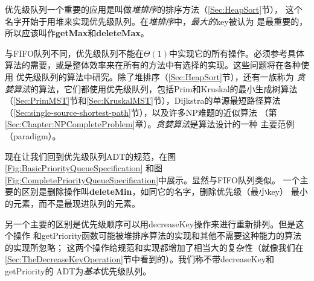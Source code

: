 优先级队列一个重要的应用是叫做\emph{堆排序}的排序方法（\ref{Sec:HeapSort}节），
这个名字开始于用堆来实现优先级队列。在\emph{堆排序}中，\emph{最大的}key被认为
是最重要的，所以应该叫作\textbf{getMax}和\textbf{deleteMax}。

与FIFO队列不同，优先级队列不能在$\Theta(1)$中实现它的所有操作。必须参考具体
算法的需要，或是整体效率来在所有的方法中有选择的实现。这些问题将在各种使用
优先级队列的算法中研究。除了堆排序（\ref{Sec:HeapSort}节），还有一族称为
\emph{贪婪算法}的算法，它们都使用优先级队列，包括Prim和Kruskal的最小生成树算法
（\ref{Sec:PrimMST}节和\ref{Sec:KruskalMST}节），Dijkstra的单源最短路径算法
（\ref{Sec:single-source-shortest-path}节），以及许多NP难题的近似算法
（第\ref{Sec:Chapter:NPCompleteProblem}章）。\emph{贪婪算法}是算法设计的一种
主要范例（paradigm）。

现在让我们回到优先级队列ADT的规范，在图\ref{Fig:BasicPriorityQueueSpecification}
和图\ref{Fig:CompletePriorityQueueSpecification}中展示。显然与FIFO队列类似。
一个主要的区别是删除操作叫\textbf{deleteMin}，如同它的名字，删除优先级（最小key）
最小的元素，而不是最现进队列的元素。

另一个主要的区别是优先级顺序可以用decreaseKey操作来进行重新排列。但是这个操作
和getPriority函数可能被堆排序算法的实现和其他不需要这种能力的算法的实现所忽略；
这两个操作给规范和实现都增加了相当大的复杂性（就像我们在
\ref{Sec:TheDecreaseKeyOperation}节中看到的）。我们称不带decreaseKey和getPriority的
ADT为\emph{基本}优先级队列。


